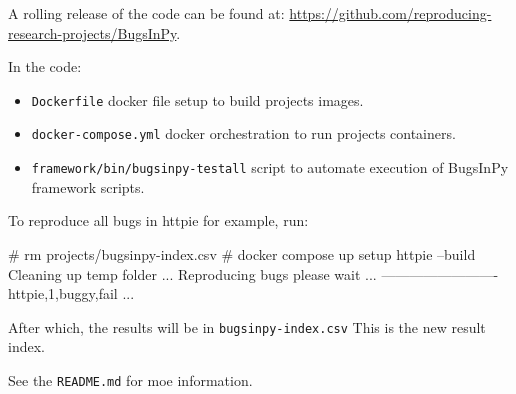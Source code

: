 \documentclass[conference]{IEEEtran}
\begin{document}

A rolling release of the code can be found at: \url{https://github.com/reproducing-research-projects/BugsInPy}.

In the code:
\begin{itemize}
  \item \texttt{Dockerfile} docker file setup to build projects images.
  \item \texttt{docker-compose.yml} docker orchestration to run projects containers.
  \item \texttt{framework/bin/bugsinpy-testall} script to automate execution of BugsInPy framework scripts.
\end{itemize}

To reproduce all bugs in httpie for example, run: 

\begin{verbatim*}
# rm projects/bugsinpy-index.csv
# docker compose up setup httpie --build
Cleaning up temp folder ...
Reproducing bugs please wait ...
-------------------------
httpie,1,buggy,fail
...
\end{verbatim*}

After which, the results will be in \texttt{bugsinpy-index.csv} This is the new result index.

See the \texttt{README.md} for moe information.
\end{document}
